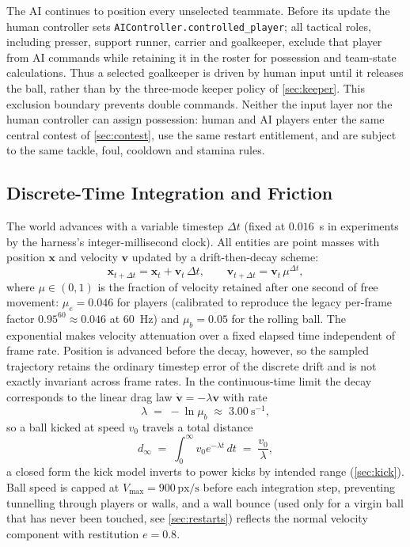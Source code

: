\documentclass[10pt,twocolumn]{article}
\newcommand{\pxs}{\ensuremath{\,\mathrm{px/s}}}
\newcommand{\code}[1]{\texttt{#1}}
\begin{document}
The AI continues to position every unselected teammate. Before its update the
human controller sets \code{AIController.controlled\_player}; all tactical
roles, including presser, support runner, carrier and goalkeeper, exclude that
player from AI commands while retaining it in the roster for possession and
team-state calculations. Thus a selected goalkeeper is driven by human input
until it releases the ball, rather than by the three-mode keeper policy of
\cref{sec:keeper}. This exclusion boundary prevents double commands.
Neither the input layer nor the human controller can assign possession:
human and AI players enter the same central contest of
\cref{sec:contest}, use the same restart entitlement, and are subject to the
same tackle, foul, cooldown and stamina rules.

\subsection{Discrete-Time Integration and Friction}\label{sec:physics}

The world advances with a variable timestep $\Delta t$ (fixed at
$0.016$~s in experiments by the harness's integer-millisecond clock). All
entities are point masses with position
$\mathbf{x}$ and velocity $\mathbf{v}$ updated by a drift-then-decay scheme:
\begin{equation}\label{eq:integrate}
\mathbf{x}_{t+\Delta t} = \mathbf{x}_t + \mathbf{v}_t\,\Delta t,
\qquad
\mathbf{v}_{t+\Delta t} = \mathbf{v}_t\,\mu^{\Delta t},
\end{equation}
where $\mu \in (0,1)$ is the fraction of velocity retained after one second
of free movement: $\mu_e = 0.046$ for players (calibrated to reproduce the
legacy per-frame factor $0.95^{60}\!\approx\!0.046$ at 60~Hz) and
$\mu_b = 0.05$ for the rolling ball. The exponential makes velocity
attenuation over a fixed elapsed time independent of frame rate. Position is
advanced before the decay, however, so the sampled trajectory retains the
ordinary timestep error of the discrete drift and is not exactly invariant
across frame rates. In the continuous-time limit the decay corresponds to the
linear drag law
$\dot{\mathbf v} = -\lambda \mathbf v$ with rate
\begin{equation}\label{eq:lambda}
\lambda \;=\; -\ln \mu_b \;\approx\; 3.00\ \text{s}^{-1},
\end{equation}
so a ball kicked at speed $v_0$ travels a total distance
\begin{equation}\label{eq:reach}
d_{\infty} \;=\; \int_0^{\infty} v_0 e^{-\lambda t}\,dt \;=\; \frac{v_0}{\lambda},
\end{equation}
a closed form the kick model inverts to power kicks by intended range
(\cref{sec:kick}). Ball speed is capped at $V_{\max}=900\pxs$ before each
integration step, preventing tunnelling through players or walls, and a
wall bounce (used only for a virgin ball that has never been touched, see
\cref{sec:restarts}) reflects the normal velocity component with
restitution $e = 0.8$.
\end{document}
